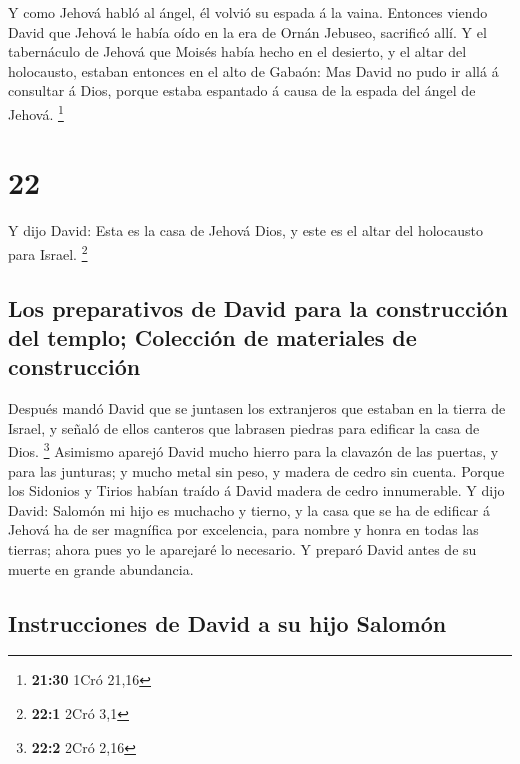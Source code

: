  Y como Jehová habló al ángel, él volvió su espada á la
vaina.  Entonces viendo David que Jehová le había oído en
la era de Ornán Jebuseo, sacrificó allí.  Y el tabernáculo
de Jehová que Moisés había hecho en el desierto, y el altar del
holocausto, estaban entonces en el alto de Gabaón: Mas David no pudo ir
allá á consultar á Dios, porque estaba espantado á causa de la espada
del ángel de Jehová. \footnote{\textbf{21:30} 1Cró 21,16}

\hypertarget{section-21}{%
\section{22}\label{section-21}}

 Y dijo David: Esta es la casa de Jehová Dios, y este es el
altar del holocausto para Israel. \footnote{\textbf{22:1} 2Cró 3,1}

\hypertarget{los-preparativos-de-david-para-la-construcciuxf3n-del-templo-colecciuxf3n-de-materiales-de-construcciuxf3n}{%
\subsection{Los preparativos de David para la construcción del templo;
Colección de materiales de
construcción}\label{los-preparativos-de-david-para-la-construcciuxf3n-del-templo-colecciuxf3n-de-materiales-de-construcciuxf3n}}

 Después mandó David que se juntasen los extranjeros que
estaban en la tierra de Israel, y señaló de ellos canteros que labrasen
piedras para edificar la casa de Dios. \footnote{\textbf{22:2} 2Cró 2,16}
 Asimismo aparejó David mucho hierro para la clavazón de las
puertas, y para las junturas; y mucho metal sin peso, y madera de cedro
sin cuenta.  Porque los Sidonios y Tirios habían traído á
David madera de cedro innumerable.  Y dijo David: Salomón mi
hijo es muchacho y tierno, y la casa que se ha de edificar á Jehová ha
de ser magnífica por excelencia, para nombre y honra en todas las
tierras; ahora pues yo le aparejaré lo necesario. Y preparó David antes
de su muerte en grande abundancia.

\hypertarget{instrucciones-de-david-a-su-hijo-salomuxf3n}{%
\subsection{Instrucciones de David a su hijo
Salomón}\label{instrucciones-de-david-a-su-hijo-salomuxf3n}}

